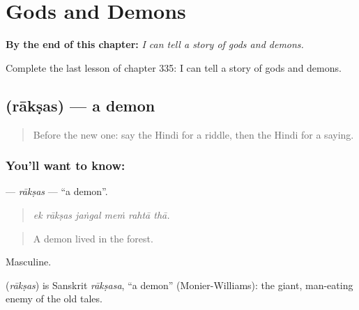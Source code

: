 
\chapter{Gods and Demons}
\label{ch:hi-gods-and-demons}

\begin{chapteropening}
\textbf{By the end of this chapter:} \emph{I can tell a story of gods and demons.}

Complete the last lesson of chapter 335: I can tell a story of gods and demons.
\end{chapteropening}

\section[\texorpdfstring{\hi{राक्षस} (rākṣas)}{राक्षस (rākṣas)}]{ (rākṣas) — a demon}

\label{lesson:HI-C335-raksas}



\begin{quote}
Before the new one: say the Hindi for a riddle, then the Hindi for a saying.
\end{quote}

\subsection*{You'll want to know: }
\textbf{} — \emph{rākṣas} — \textquotedblleft{}a demon\textquotedblright{}.

\begin{quote}
     
\end{quote}

\begin{quote}
\emph{ek rākṣas jaṅgal meṁ rahtā thā.}
\end{quote}

\begin{quote}
A demon lived in the forest.
\end{quote}

Masculine.

\begin{cousinweb}
\textbf{} (\emph{rākṣas}) is Sanskrit \emph{rākṣasa}, \textquotedblleft{}a demon\textquotedblright{} (Monier-Williams): the giant, man-eating enemy of the old tales.
\end{cousinweb}

